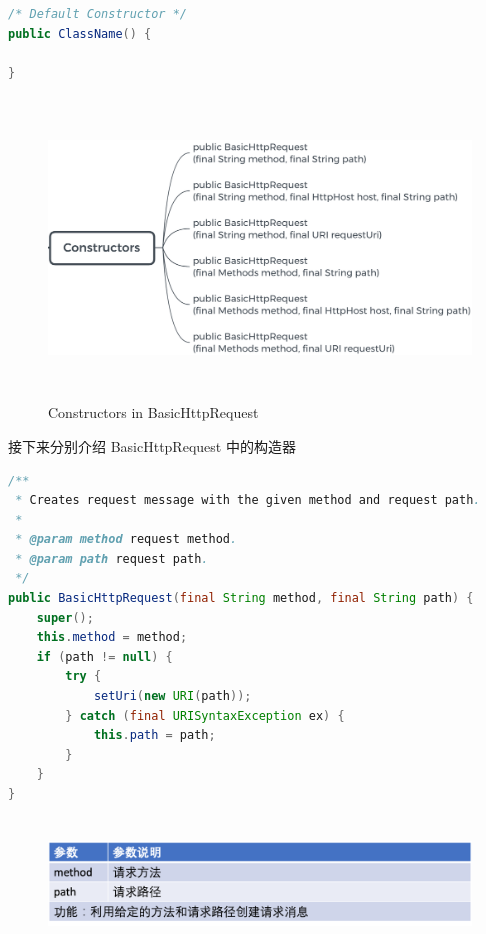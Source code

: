 \documentclass{article}
\begin{document}
	\begin{lstlisting}[language={java}]
/* Default Constructor */
public ClassName() {
	
}
	\end{lstlisting}

	\begin{figure}[H]
		\centering
		\includegraphics[height = 8cm, width = 13cm]{pics/17_Request_constructors.png}	
		\caption{Constructors in BasicHttpRequest}
	\end{figure}
	\begin{CJK}{UTF8}{gbsn}
		接下来分别介绍 BasicHttpRequest 中的构造器
	\end{CJK}{}
	\clearpage
	\begin{lstlisting}[language={java}]
/**
 * Creates request message with the given method and request path.
 *
 * @param method request method.
 * @param path request path.
 */
public BasicHttpRequest(final String method, final String path) {
    super();
    this.method = method;
    if (path != null) {
        try {
            setUri(new URI(path));
        } catch (final URISyntaxException ex) {
            this.path = path;
        }
    }
}

	\end{lstlisting}
	\begin{figure}[H]
		\centering
		\includegraphics[height = 3.5cm, width = 18cm]{pics/18_Request_table_1_4.png}	
	\end{figure}
\end{document}
